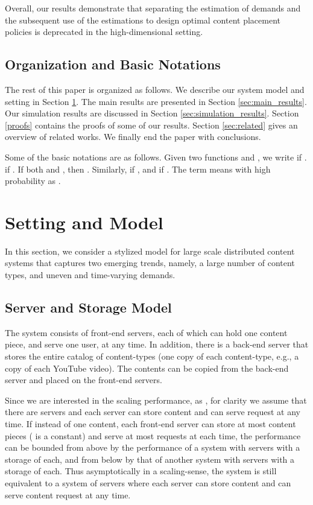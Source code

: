 \documentclass[10pt, conference, letterpaper]{IEEEtran}
\begin{document}
Overall, our results demonstrate that separating the estimation of
demands and the subsequent use of the estimations to design optimal
content placement policies is deprecated in the high-dimensional
setting.


\subsection{Organization and Basic Notations}
The rest of this paper is organized as follows. We describe our system model and setting in Section \ref{sec:system_model}. The main results are presented in Section \ref{sec:main_results}. Our simulation results are discussed in Section \ref{sec:simulation_results}. Section \ref{proofs} contains the proofs of some of our results. Section \ref{sec:related} gives an overview of related works. We finally end the paper with conclusions. 

Some of the basic notations are as follows. Given two functions  and , we write  if .  if . If both  and , then . Similarly,  if , and  if . The term  means with high probability as .  

\section{Setting and Model}
\label{sec:system_model}
In this section, we consider a stylized model for large scale
distributed content systems that captures two emerging trends, namely,
a large number of content types, and uneven and time-varying demands.

\subsection{Server and Storage Model}


The system consists of  front-end servers, each of which can hold one content piece, and serve one user, at any time. In addition, there is a back-end server that stores the entire
catalog of  content-types (one copy of each content-type, e.g., a
copy of each YouTube video). The contents can be copied from the
back-end server and placed on the front-end servers. 

Since we are interested in the scaling performance, as , for clarity we assume that there are  servers and each server can store  content and can serve 
request at any time. If instead of one content, each front-end server can store at most  content pieces ( is a constant) and serve at most  requests at each time, the performance can be bounded from above by the performance of a system with  servers with a storage of  each, and from below by that of another system with  servers with a storage of  each. Thus asymptotically in a scaling-sense, the system is still equivalent to a system of  servers where each server can store  content and can serve  content request at any time. 
\end{document}
